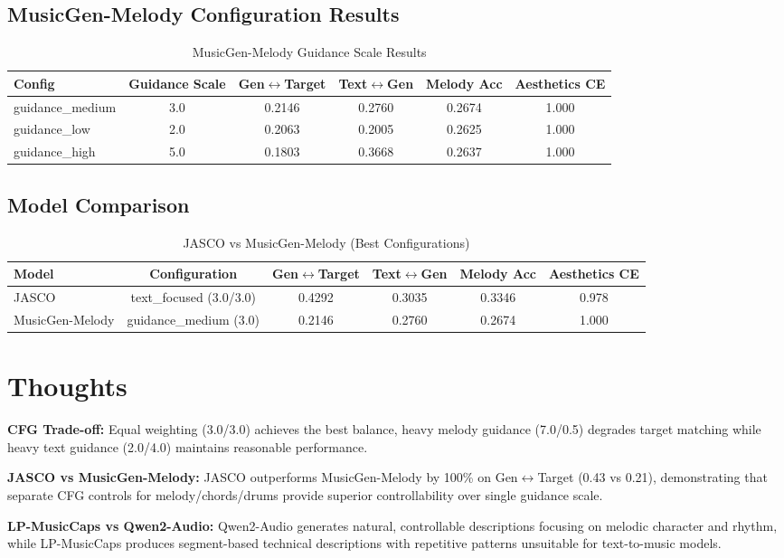 \documentclass{article}
\begin{document}
\begin{CJK}{UTF8}{bsmi}
\subsection{MusicGen-Melody Configuration Results}

\begin{table}[h]
\centering
\caption{MusicGen-Melody Guidance Scale Results}
\label{tab:musicgen_guidance}
\begin{tabular}{lccccc}
\toprule
Config & Guidance Scale & Gen$\leftrightarrow$Target & Text$\leftrightarrow$Gen & Melody Acc & Aesthetics CE \\
\midrule
guidance\_medium & 3.0 & 0.2146 & 0.2760 & 0.2674 & 1.000 \\
guidance\_low & 2.0 & 0.2063 & 0.2005 & 0.2625 & 1.000 \\
guidance\_high & 5.0 & 0.1803 & 0.3668 & 0.2637 & 1.000 \\
\bottomrule
\end{tabular}
\end{table}

\subsection{Model Comparison}

\begin{table}[h]
\centering
\caption{JASCO vs MusicGen-Melody (Best Configurations)}
\label{tab:model_comparison}
\begin{tabular}{lccccc}
\toprule
Model & Configuration & Gen$\leftrightarrow$Target & Text$\leftrightarrow$Gen & Melody Acc & Aesthetics CE \\
\midrule
JASCO & text\_focused (3.0/3.0) & 0.4292 & 0.3035 & 0.3346 & 0.978 \\
MusicGen-Melody & guidance\_medium (3.0) & 0.2146 & 0.2760 & 0.2674 & 1.000 \\
\bottomrule
\end{tabular}
\end{table}

\section{Thoughts}

\textbf{CFG Trade-off:} Equal weighting (3.0/3.0) achieves the best balance, heavy melody guidance (7.0/0.5) degrades target matching while heavy text guidance (2.0/4.0) maintains reasonable performance.

\textbf{JASCO vs MusicGen-Melody:} JASCO outperforms MusicGen-Melody by 100\% on Gen$\leftrightarrow$Target (0.43 vs 0.21), demonstrating that separate CFG controls for melody/chords/drums provide superior controllability over single guidance scale.

\textbf{LP-MusicCaps vs Qwen2-Audio:} Qwen2-Audio generates natural, controllable descriptions focusing on melodic character and rhythm, while LP-MusicCaps produces segment-based technical descriptions with repetitive patterns unsuitable for text-to-music models.

\end{CJK}
\end{document}
